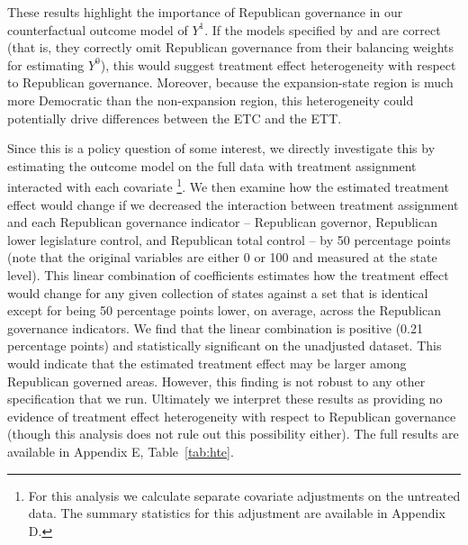 These results highlight the importance of Republican governance in our counterfactual outcome model of $Y^1$. If the models specified by \cite{kaestner2017effects} and \cite{courtemanche2017early} are correct (that is, they correctly omit Republican governance from their balancing weights for estimating $Y^0$), this would suggest treatment effect heterogeneity with respect to Republican governance. Moreover, because the expansion-state region is much more Democratic than the non-expansion region, this heterogeneity could potentially drive differences between the ETC and the ETT.

Since this is a policy question of some interest, we directly investigate this by estimating the outcome model on the full data with treatment assignment interacted with each covariate \footnote{For this analysis we calculate separate covariate adjustments on the untreated data. The summary statistics for this adjustment are available in Appendix D.}. We then examine how the estimated treatment effect would change if we decreased the interaction between treatment assignment and each Republican governance indicator -- Republican governor, Republican lower legislature control, and Republican total control -- by 50 percentage points (note that the original variables are either 0 or 100 and measured at the state level). This linear combination of coefficients estimates how the treatment effect would change for any given collection of states against a set that is identical except for being 50 percentage points lower, on average, across the Republican governance indicators. We find that the linear combination is positive (0.21 percentage points) and statistically significant on the unadjusted dataset. This would indicate that the estimated treatment effect may be larger among Republican governed areas. However, this finding is not robust to any other specification that we run. Ultimately we interpret these results as providing no evidence of treatment effect heterogeneity with respect to Republican governance (though this analysis does not rule out this possibility either). The full results are available in Appendix E, Table~\ref{tab:hte}.